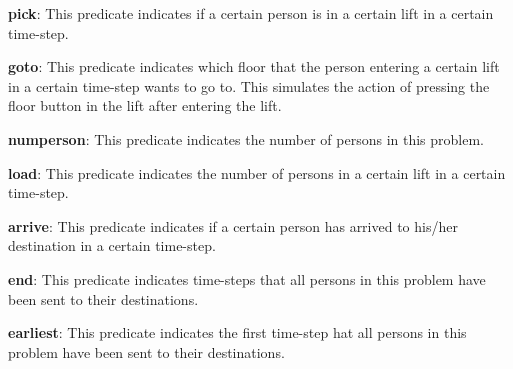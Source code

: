 \documentclass{article}
\begin{document}
\begin{Question}[Overview]
\begin{Subquestion}
\begin{answer}
\item \textbf{pick}: This predicate indicates if a certain person is in a certain lift in a certain time-step. 
\item \textbf{goto}: This predicate indicates which floor that the person entering a certain lift in a certain time-step wants to go to. This simulates the action of pressing the floor button in the lift after entering the lift. 
\item \textbf{numperson}: This predicate indicates the number of persons in this problem. 
\item \textbf{load}: This predicate indicates the number of persons in a certain lift in a certain time-step. 
\item \textbf{arrive}: This predicate indicates if a certain person has arrived to his/her destination in a certain time-step. 
\item \textbf{end}: This predicate indicates time-steps that all persons in this problem have been sent to their destinations. 
\item \textbf{earliest}: This predicate indicates the first time-step hat all persons in this problem have been sent to their destinations. 


\end{answer}
\end{Subquestion}
\end{Question}
\end{document}
